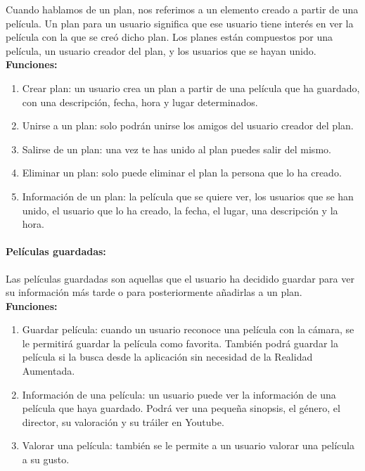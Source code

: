 Cuando hablamos de un plan, nos referimos a un elemento creado a partir de una película. Un plan para un usuario significa que ese usuario tiene interés en ver la película con la que se creó dicho plan.
Los planes están compuestos por una película, un usuario creador del plan, y los usuarios que se hayan unido.
\\
\textbf{Funciones:}
\begin{enumerate}
    \item Crear plan: un usuario crea un plan a partir de una película que ha guardado, con una descripción, fecha, hora y lugar determinados.
    \item Unirse a un plan: solo podrán unirse los amigos del usuario creador del plan.
    \item Salirse de un plan: una vez te has unido al plan puedes salir del mismo.
    \item Eliminar un plan: solo puede eliminar el plan la persona que lo ha creado.
    \item Información de un plan: la película que se quiere ver, los usuarios que se han unido, el usuario que lo ha creado, la fecha, el lugar, una descripción y la hora.
\end{enumerate} 
\paragraph{\large Películas guardadas:\\}

Las películas guardadas son aquellas que el usuario ha decidido guardar para ver su información más tarde o para posteriormente añadirlas a un plan.
\\
\textbf{Funciones:}
\begin{enumerate}
    \item Guardar película: cuando un usuario reconoce una película con la cámara, se le permitirá guardar la película como favorita. También podrá guardar la película si la busca desde la aplicación sin necesidad de la Realidad Aumentada.
    \item Información de una película: un usuario puede ver la información de una película que haya guardado. Podrá ver una pequeña sinopsis, el género, el director, su valoración y su tráiler en Youtube.
    \item Valorar una película: también se le permite a un usuario valorar una película a su gusto.
\end{enumerate} 
